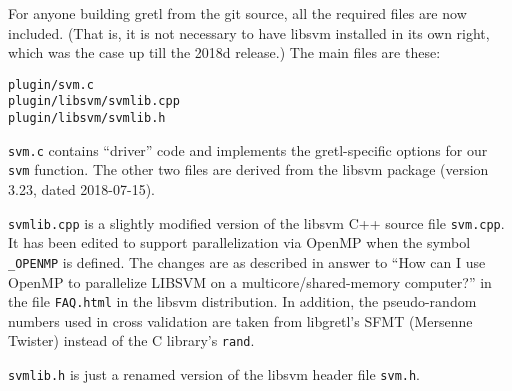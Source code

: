 \documentclass{article}
\begin{document}
For anyone building gretl from the git source, all the required files
are now included. (That is, it is not necessary to have
\textsf{libsvm} installed in its own right, which was the case up till
the 2018d release.) The main files are these:
\begin{verbatim}
plugin/svm.c
plugin/libsvm/svmlib.cpp
plugin/libsvm/svmlib.h
\end{verbatim}

\texttt{svm.c} contains ``driver'' code and implements the
gretl-specific options for our \texttt{svm} function. The other two
files are derived from the \textsf{libsvm} package (version 3.23,
dated 2018-07-15).

\texttt{svmlib.cpp} is a slightly modified version of the
\textsf{libsvm} C++ source file \texttt{svm.cpp}. It has been edited
to support parallelization via \textsf{OpenMP} when the symbol
\texttt{\_OPENMP} is defined. The changes are as described in answer
to ``How can I use OpenMP to parallelize LIBSVM on a
multicore/shared-memory computer?'' in the file \texttt{FAQ.html} in
the \textsf{libsvm} distribution. In addition, the pseudo-random
numbers used in cross validation are taken from libgretl's
\textsf{SFMT} (Mersenne Twister) instead of the C library's
\texttt{rand}.

\texttt{svmlib.h} is just a renamed version of the \textsf{libsvm}
header file \texttt{svm.h}.



\end{document}
